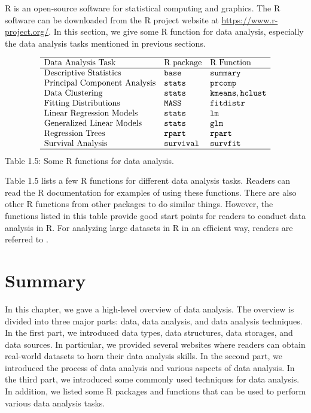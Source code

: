 \documentclass[]{book}
\theoremstyle{definition}
\theoremstyle{definition}
\theoremstyle{definition}
\theoremstyle{remark}
\begin{document}
R is an open-source software for statistical computing and graphics. The
R software can be downloaded from the R project website at
\url{https://www.r-project.org/}. In this section, we give some R
function for data analysis, especially the data analysis tasks mentioned
in previous sections.

\[\begin{matrix}
\begin{array}{lll} \hline
\text{Data Analysis Task} & \text{R package} & \text{R Function} \\\hline
\text{Descriptive Statistics} & \texttt{base} & \texttt{summary}\\
\text{Principal Component Analysis} & \texttt{stats} & \texttt{prcomp} \\
\text{Data Clustering} & \texttt{stats} & \texttt{kmeans}, \texttt{hclust} \\
\text{Fitting Distributions} & \texttt{MASS} & \texttt{fitdistr} \\
\text{Linear Regression Models} & \texttt{stats} & \texttt{lm} \\
\text{Generalized Linear Models} & \texttt{stats} & \texttt{glm} \\
\text{Regression Trees} & \texttt{rpart} & \texttt{rpart} \\
\text{Survival Analysis} & \texttt{survival} & \texttt{survfit} \\
\hline
\end{array}
\end{matrix}
\] Table 1.5: Some R functions for data analysis.

Table 1.5 lists a few R functions for different data analysis tasks.
Readers can read the R documentation for examples of using these
functions. There are also other R functions from other packages to do
similar things. However, the functions listed in this table provide good
start points for readers to conduct data analysis in R. For analyzing
large datasets in R in an efficient way, readers are referred to
\citep{daroczi2015}.

\section{Summary}\label{summary}

In this chapter, we gave a high-level overview of data analysis. The
overview is divided into three major parts: data, data analysis, and
data analysis techniques. In the first part, we introduced data types,
data structures, data storages, and data sources. In particular, we
provided several websites where readers can obtain real-world datasets
to horn their data analysis skills. In the second part, we introduced
the process of data analysis and various aspects of data analysis. In
the third part, we introduced some commonly used techniques for data
analysis. In addition, we listed some R packages and functions that can
be used to perform various data analysis tasks.
\end{document}
